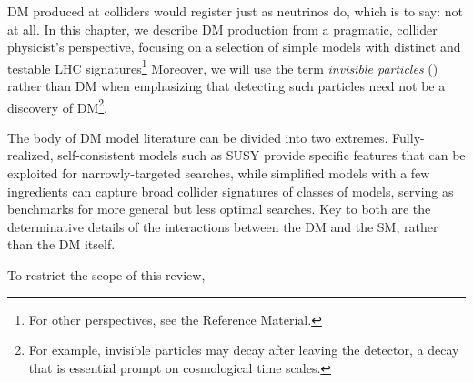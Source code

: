 DM produced at colliders would register just as neutrinos do, which is to say: not at all. 
In this chapter, we describe DM production from a pragmatic, collider physicist's perspective, focusing on a selection of simple models with distinct and testable LHC signatures\footnote{For other perspectives, see the Reference Material.} 
Moreover, we will use the term {\it invisible particles} (\IP) rather than DM when emphasizing that detecting such particles need not be a discovery of DM\footnote{For example, invisible particles may decay after leaving the detector, a decay that is essential prompt on cosmological time scales.}.


The body of DM model literature can be divided into two extremes.%
Fully-realized, self-consistent models such as SUSY provide specific features that can be exploited for narrowly-targeted searches, while simplified models with a few ingredients can capture broad collider signatures of classes of models, serving as benchmarks for more general but less optimal searches.
Key to both are the determinative details of the interactions between the DM and the SM, rather than the DM itself.




To restrict the scope of this review,




